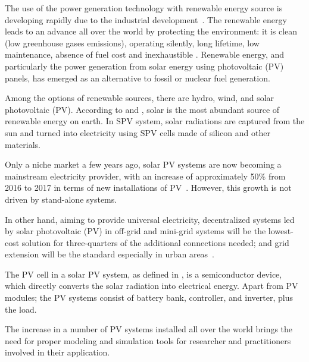 The use of the power generation technology with renewable energy source is developing rapidly due to the industrial development~\cite{Yatimi}. The renewable energy leads to an advance all over the world by protecting the environment: it is clean (low greenhouse gases emissions), operating silently, long lifetime, low maintenance, absence of fuel cost and inexhaustible \cite{Noroozian}. Renewable energy, and particularly the power generation from solar energy using photovoltaic (PV) panels, has emerged as an alternative to fossil or nuclear fuel generation. 

Among the options of renewable sources, there are hydro, wind, and solar photovoltaic (PV). According to \cite{SEIA} and \cite{Chauhan}, solar is the most abundant source of renewable energy on earth. In SPV system, solar radiations are captured from the sun and turned into electricity using SPV cells made of silicon and other materials.

Only a niche market a few years ago, solar PV systems are now becoming a mainstream electricity provider, with an increase of approximately 50\% from 2016 to 2017 in terms of new installations of PV~\cite{EPIA}. However, this growth is not driven by stand-alone systems.

In other hand, aiming to provide universal electricity, decentralized systems led by solar photovoltaic (PV) in off-grid and mini-grid systems will be the lowest-cost solution for three-quarters of the additional connections needed; and grid extension will be the standard especially in urban areas~\cite{IEAweo2018}.

The PV cell in a solar PV system, as defined in \cite{Rawat}, is a semiconductor device, which directly converts the solar radiation into electrical energy. Apart from PV modules; the PV systems consist of battery bank, controller, and inverter, plus the load.
%
%

The increase in a number of PV systems installed all over the world brings the need for proper modeling and simulation tools for researcher and practitioners involved in their application. 

